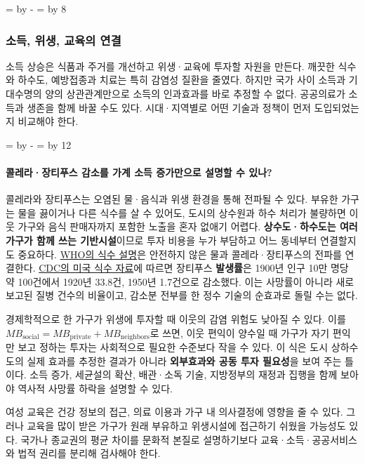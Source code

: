 \documentclass[10pt,a4paper]{article}
\newcommand{\ReserveQuestionSpace}{%
  \par\begingroup
  \dimen0=\pagegoal \advance\dimen0 by -\pagetotal
  \dimen2=\baselineskip \multiply\dimen2 by 12
  \ifdim\dimen0<\dimen2 \newpage\fi
  \endgroup}
\newcommand{\ReserveReadingSectionSpace}{%
  \par\begingroup
  \dimen0=\pagegoal \advance\dimen0 by -\pagetotal
  \dimen2=\baselineskip \multiply\dimen2 by 8
  \ifdim\dimen0<\dimen2 \newpage\fi
  \endgroup}
\begin{document}
\ReserveReadingSectionSpace
\subsubsection*{소득, 위생, 교육의 연결}

소득 상승은 식품과 주거를 개선하고 위생·교육에 투자할 자원을 만든다. 깨끗한 식수와 하수도, 예방접종과 치료는 특히 감염성 질환을 줄였다. 하지만 국가 사이 소득과 기대수명의 양의 상관관계만으로 소득의 인과효과를 바로 추정할 수 없다. 공공의료가 소득과 생존을 함께 바꿀 수도 있다. 시대·지역별로 어떤 기술과 정책이 먼저 도입되었는지 비교해야 한다.\par

\ReserveQuestionSpace
\paragraph{콜레라·장티푸스 감소를 가계 소득 증가만으로 설명할 수 있나?}
콜레라와 장티푸스는 오염된 물·음식과 위생 환경을 통해 전파될 수 있다. 부유한 가구는 물을 끓이거나 다른 식수를 살 수 있어도, 도시의 상수원과 하수 처리가 불량하면 이웃 가구와 음식 판매자까지 포함한 노출을 혼자 없애기 어렵다. \textbf{상수도·하수도는 여러 가구가 함께 쓰는 기반시설}이므로 투자 비용을 누가 부담하고 어느 동네부터 연결할지도 중요하다. \href{https://www.who.int/news-room/fact-sheets/detail/drinking-water/}{WHO의 식수 설명}은 안전하지 않은 물과 콜레라·장티푸스의 전파를 연결한다. \href{https://stacks.cdc.gov/view/cdc/51495/}{CDC의 미국 식수 자료}에 따르면 장티푸스 \textbf{발생률}은 1900년 인구 10만 명당 약 100건에서 1920년 33.8건, 1950년 1.7건으로 감소했다. 이는 사망률이 아니라 새로 보고된 질병 건수의 비율이고, 감소분 전부를 한 정수 기술의 순효과로 돌릴 수는 없다.\par

경제학적으로 한 가구가 위생에 투자할 때 이웃의 감염 위험도 낮아질 수 있다. 이를 $MB_{\mathrm{social}}=MB_{\mathrm{private}}+MB_{\mathrm{neighbors}}$로 쓰면, 이웃 편익이 양수일 때 가구가 자기 편익만 보고 정하는 투자는 사회적으로 필요한 수준보다 작을 수 있다. 이 식은 도시 상하수도의 실제 효과를 추정한 결과가 아니라 \textbf{외부효과와 공동 투자 필요성}을 보여 주는 틀이다. 소득 증가, 세균설의 확산, 배관·소독 기술, 지방정부의 재정과 집행을 함께 보아야 역사적 사망률 하락을 설명할 수 있다.\par

여성 교육은 건강 정보의 접근, 의료 이용과 가구 내 의사결정에 영향을 줄 수 있다. 그러나 교육을 많이 받은 가구가 원래 부유하고 위생시설에 접근하기 쉬웠을 가능성도 있다. 국가나 종교권의 평균 차이를 문화적 본질로 설명하기보다 교육·소득·공공서비스와 법적 권리를 분리해 검사해야 한다.\par
\end{document}
